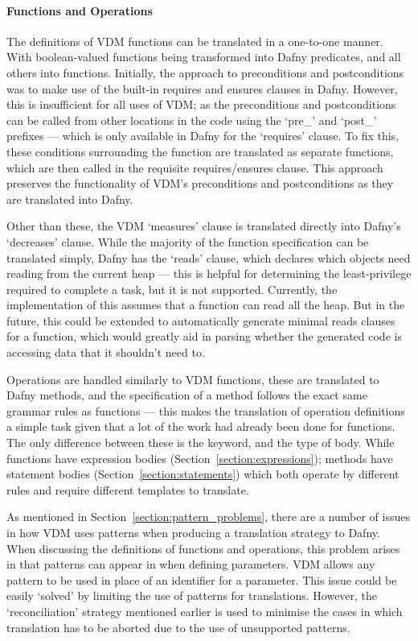 \documentclass{entcs}
\begin{document}
\paragraph{Functions and Operations} 
The definitions of VDM functions can be translated in a one-to-one manner. With boolean-valued functions being transformed into Dafny predicates, and all others into functions. Initially, the approach to preconditions and postconditions was to make use of the built-in requires and ensures clauses in Dafny. However, this is insufficient for all uses of VDM; as the preconditions and postconditions can be called from other locations in the code using the `pre\_' and `post\_' prefixes --- which is only available in Dafny for the `requires' clause. To fix this, these conditions surrounding the function are translated as separate functions, which are then called in the requisite requires/ensures clause. This approach preserves the functionality of VDM's preconditions and postconditions as they are translated into Dafny. 

Other than these, the VDM `measures' clause is translated directly into Dafny's `decreases' clause. While the majority of the function specification can be translated simply, Dafny has the `reads' clause, which declares which objects need reading from the current heap --- this is helpful for determining the least-privilege required to complete a task, but it is not supported. Currently, the implementation of this assumes that a function can read all the heap. But in the future, this could be extended to automatically generate minimal reads clauses for a function, which would greatly aid in parsing whether the generated code is accessing data that it shouldn't need to.

Operations are handled similarly to VDM functions, these are translated to Dafny methods, and the specification of a method follows the exact same grammar rules as functions --- this makes the translation of operation definitions a simple task given that a lot of the work had already been done for functions. The only difference between these is the keyword, and the type of body. While functions have expression bodies (Section~\ref{section:expressions}); methods have statement bodies (Section~\ref{section:statements}) which both operate by different rules and require different templates to translate.

As mentioned in Section~\ref{section:pattern_problems}, there are a number of issues in how VDM uses patterns when producing a translation strategy to Dafny. When discussing the definitions of functions and operations, this problem arises in that patterns can appear in when defining parameters. VDM allows any pattern to be used in place of an identifier for a parameter. This issue could be easily `solved' by limiting the use of patterns for translations. However, the `reconciliation' strategy mentioned earlier is used to minimise the cases in which translation has to be aborted due to the use of unsupported patterns.
\end{document}
